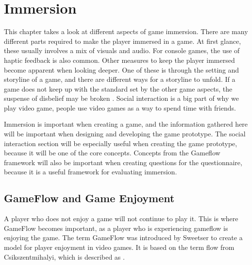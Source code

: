 \chapter{Immersion}
\label{ch:immersion}

This chapter takes a look at different aspects of game immersion. There are many different parts required to make the player immersed in a game.
At first glance, these usually involves a mix of visuals and audio.
For console games, the use of haptic feedback is also common.
Other measures to keep the player immersed become apparent when looking deeper.
One of these is through the setting and storyline of a game, and there are different ways for a storyline to unfold.
If a game does not keep up with the standard set by the other game aspects, the suspense of disbelief may be broken \cite{overmars2012}. Social interaction is a big part of why we play video game, people use video games as a way to spend time with friends.

Immersion is important when creating a game, and the information gathered here will be important when designing and developing the game prototype. The social interaction  section will be especially useful when creating the game prototype, because it will be one of the core concepts. Concepts from the Gameflow framework will also be important when creating questions for the questionnaire, because it is a useful framework for evaluating immersion.


\section{GameFlow and Game Enjoyment}
\label{immersionGameflow}
A player who does not enjoy a game will not continue to play it.
This is where GameFlow becomes important, as a player who is experiencing gameflow is enjoying the game.
The term GameFlow was introduced by Sweetser \cite{sweetser2005gameflow} to create a model for player enjoyment in video games.
It is based on the term flow from Csikszentmihalyi, which is described as .

